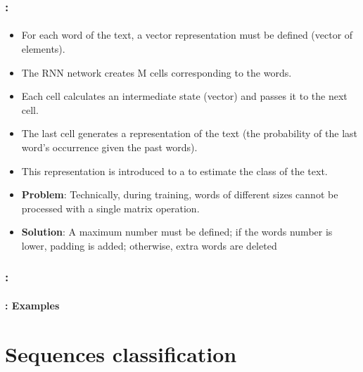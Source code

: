 \documentclass[xcolor=table]{beamer}
\begin{document}
\begin{frame}
	\frametitle{\insertshortsubtitle: \insertsection}
	\framesubtitle{\insertsubsection}
	
	\begin{itemize}
		\item For each word of the text, a vector representation must be defined (vector of  elements).
		\item The RNN network creates M cells corresponding to the  words.
		\item Each cell calculates an intermediate state (vector) and passes it to the next cell.
		\item The last cell generates a representation of the text (the probability of the last word's occurrence given the past words).
		\item This representation is introduced to a  to estimate the class of the text.
		\item \textbf{Problem}: Technically, during training, words of different sizes cannot be processed with a single matrix operation.
		\item \textbf{Solution}: \textcolor{yellow!30}{A maximum number must be defined; if the words number is lower, padding is added; otherwise, extra words are deleted}
	\end{itemize}
	
\end{frame}

\begin{frame}
	\frametitle{\insertshortsubtitle: \insertsection}
	\framesubtitle{\insertsubsection: Examples}
	
	
\end{frame}

\section{Sequences classification}
\end{document}
